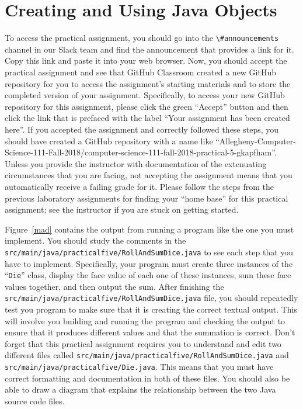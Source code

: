 \documentclass[11pt]{article}
\newcommand{\mainprogramsource}{\lstinline{src/main/java/practicalfive/RollAndSumDice.java}}
\newcommand{\secondprogramsource}{\lstinline{src/main/java/practicalfive/Die.java}}
\newcommand{\command}[1]{``\lstinline{#1}''}
\newcommand{\channel}[1]{\lstinline{#1}}
\begin{document}
\section*{Creating and Using Java Objects}

To access the practical assignment, you should go into the
\channel{\#announcements} channel in our Slack team and find the announcement
that provides a link for it. Copy this link and paste it into your web browser.
Now, you should accept the practical assignment and see that GitHub Classroom
created a new GitHub repository for you to access the assignment's starting
materials and to store the completed version of your assignment. Specifically,
to access your new GitHub repository for this assignment, please click the green
``Accept'' button and then click the link that is prefaced with the label ``Your
assignment has been created here''. If you accepted the assignment and correctly
followed these steps, you should have created a GitHub repository with a name
like
``Allegheny-Computer-Science-111-Fall-2018/computer-science-111-fall-2018-practical-5-gkapfham''.
Unless you provide the instructor with documentation of the extenuating
circumstances that you are facing, not accepting the assignment means that you
automatically receive a failing grade for it. Please follow the steps from the
previous laboratory assignments for finding your ``home base'' for this
practical assignment; see the instructor if you are stuck on getting started.

Figure~\ref{mad} contains the output from running a program like the one you
must implement. You should study the comments in the \mainprogramsource{} to see
each step that you have to implement. Specifically, your program must create
three instances of the \command{Die} class, display the face value of each one
of these instances, sum these face values together, and then output the sum.
After finishing the \mainprogramsource{} file, you should repeatedly test you
program to make sure that it is creating the correct textual output. This will
involve you building and running the program and checking the output to ensure
that it produces different values and that the summation is correct. Don't
forget that this practical assignment requires you to understand and edit two
different files called \mainprogramsource{} and \secondprogramsource{}. This
means that you must have correct formatting and documentation in both of these
files. You should also be able to draw a diagram that explains the relationship
between the two Java source code files.
\end{document}
